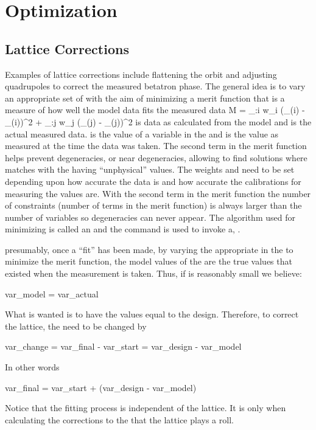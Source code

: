 \chapter{Optimization}
\label{c:opti}


\section{Lattice Corrections}

Examples of lattice corrections include flattening the orbit and
adjusting quadrupoles to correct the measured betatron phase. The
general idea is to vary an appropriate set of  with the
aim of minimizing a merit function  that is a measure of how well the
model data fits the measured data
\Begineq
  {\cal M} = \sum_{\data:i} w_i 
    (\data\_\model(i) -  \data\_\meas(i))^2 + 
  \sum_{\var:j} w_j 
    (\var\_\model(j) - \var\_\meas(j))^2
  \label{m1}
\Endeq
{} is data as calculated from the model and
 is the actual measured data.  is the
value of a variable in the  and  is the value
as measured at the time the data was taken. The second term in the
merit function helps prevent degeneracies, or near degeneracies,
allowing \tao to find solutions where  matches
 with the  having ``unphysical''
values. The weights  and  need to be set depending
upon how accurate the data is and how accurate the calibrations for
measuring the  values are. With the second term in
the merit function the number of constraints (number of terms in the
merit function) is always larger than the number of variables so
degeneracies can never appear. The algorithm used for minimizing
 is called an  and the  command is used to
invoke a, .

presumably, once a ``fit'' has been made, by varying the appropriate
 in the  to minimize the merit function, the
model values of the  are the true values that existed
when the measurement is taken. Thus, if  is reasonably small we 
believe:
\begin{example}
  var_model = var_actual
\end{example}
What is wanted is to have the  values equal to the
design. Therefore, to correct the lattice, the  need to
be changed by
\begin{example}
  var_change = var_final  - var_start
             = var_design - var_model
\end{example}
In other words
\begin{example}
  var_final = var_start + (var_design - var_model)
\end{example}
Notice that the fitting process is independent of the 
lattice. It is only when calculating the corrections to the
 that the  lattice plays a roll. 

